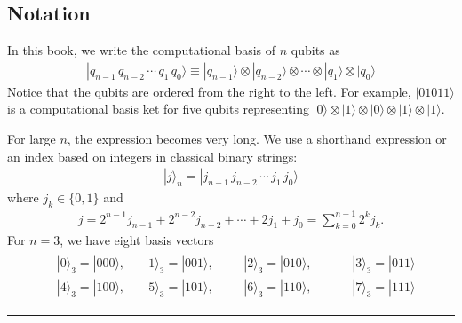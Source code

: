 \documentclass[letterpaper,10pt,english]{jupyterBook}
\begin{document}
\subsection{Notation}
\label{\detokenize{composites/morequbits:notation}}\label{\detokenize{composites/morequbits:ssec-notations}}
\sphinxAtStartPar
In this book, we write the computational basis of \(n\) qubits as
\begin{equation*}
\begin{split}
|q_{n-1}\, q_{n-2}\, \cdots\, q_1\, q_0\rangle \equiv |q_{n-1}\rangle \otimes |q_{n-2}\rangle \otimes \cdots \otimes |q_1\rangle \otimes |q_0\rangle
\end{split}
\end{equation*}
\sphinxAtStartPar
Notice that the qubits are ordered from the right to the left.  For example, \(|01011\rangle\) is a computational basis ket for five qubits representing \(|0\rangle \otimes |1\rangle \otimes |0 \rangle \otimes |1\rangle \otimes |1\rangle\).

\sphinxAtStartPar
For large \(n\), the expression becomes very long. We use a shorthand expression or an index based on integers in classical binary strings:
\begin{equation*}
\begin{split}
|j\rangle_n = |j_{n-1}\, j_{n-2}\, \cdots\, j_1\, j_0\rangle
\end{split}
\end{equation*}
\sphinxAtStartPar
where \(j_k \in \{0,1\}\) and
\begin{equation*}
\begin{split}
j = 2^{n-1} j_{n-1} + 2^{n-2} j_{n-2} + \cdots + 2 j_1 + j_0 = \sum_{k=0}^{n-1} 2^k j_k.
\end{split}
\end{equation*}
\sphinxAtStartPar
For \(n=3\), we have eight basis vectors
\begin{equation*}
\begin{split}
\begin{align}
&|0\rangle_3 = |000\rangle, && |1\rangle_3 = |001\rangle, &&& |2\rangle_3 = |010\rangle, &&&&|3\rangle_3 = |011\rangle\\
&|4\rangle_3 = |100\rangle, && |5\rangle_3 = |101\rangle, &&& |6\rangle_3 = |110\rangle, &&&&|7\rangle_3 = |111\rangle
\end{align}
\end{split}
\end{equation*}

\bigskip\hrule\bigskip
\end{document}
